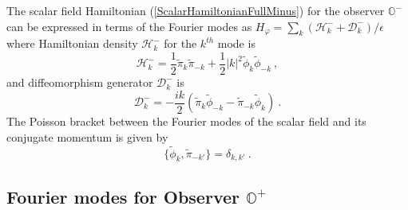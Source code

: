 \documentclass[aps,12pt,showpacs]{revtex4-2}
\def\observerminus{\mathbb{O}^{-}}
\def\observerplus{\mathbb{O}^{+}}
\begin{document}
The scalar field Hamiltonian (\ref{ScalarHamiltonianFullMinus}) for the observer
$\observerminus$ can be expressed in terms of the Fourier modes as 
$H_{\varphi} = \sum_k (\mathcal{H}_k^{-} + \mathcal{D}_k^{-})/\epsilon$ where
Hamiltonian density $\mathcal{H}_k^{-}$ for the $k^{th}$ mode is
%
\begin{equation}\label{FourierHamiltonianMinus}
\mathcal{H}_k^{-} = \frac{1}{2} \tilde{\pi}_{k}  \tilde{\pi}_{-k}
+ \frac{1}{2} |k|^2 \tilde{\phi}_{k}  \tilde{\phi}_{-k} ~,
\end{equation}
%
and diffeomorphism generator $\mathcal{D}_k^{-}$ is
\begin{equation}\label{FourierDiffeomorphismMinus}
\mathcal{D}_k^{-} = - \frac{i k}{2} \left( 
\tilde{\pi}_{k} \tilde{\phi}_{-k} - 
\tilde{\pi}_{-k} \tilde{\phi}_{k} \right) ~.
\end{equation}
%
The Poisson bracket between the Fourier modes of the scalar field and its 
conjugate momentum is given by
%
\begin{equation}\label{FourierPoissonBracketMinus}
\{\tilde{\phi}_{k}, \tilde{\pi}_{-k'}\} = \delta_{k,k'} ~.
\end{equation}
%




\subsection{Fourier modes for Observer $\observerplus$ }
\end{document}
